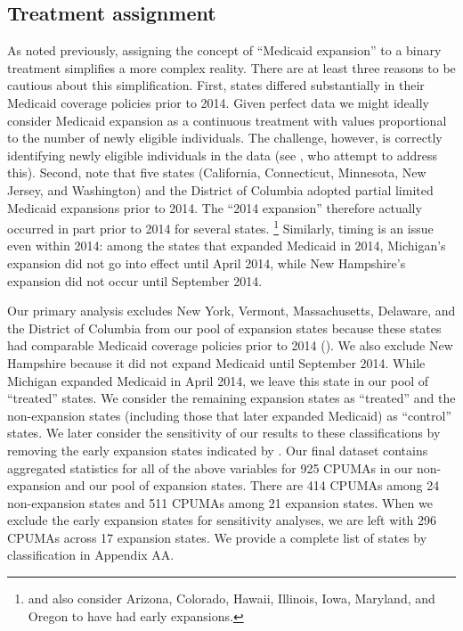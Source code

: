 \documentclass[aoas]{imsart}
\theoremstyle{plain}
\theoremstyle{remark}
\begin{document}
\subsection{Treatment assignment} \label{sssec:txassign}

As noted previously, assigning the concept of ``Medicaid expansion'' to a binary treatment simplifies a more complex reality. There are at least three reasons to be cautious about this simplification. First, states differed substantially in their Medicaid coverage policies prior to 2014. Given perfect data we might ideally consider Medicaid expansion as a continuous treatment with values proportional to the number of newly eligible individuals. The challenge, however, is correctly identifying newly eligible individuals in the data (see \cite{frean2017premium}, who attempt to address this). Second, \cite{frean2017premium} note that five states (California, Connecticut, Minnesota, New Jersey, and Washington) and the District of Columbia adopted partial limited Medicaid expansions prior to 2014. The ``2014 expansion'' therefore actually occurred in part prior to 2014 for several states. \footnote{\cite{kaestner2017effects} and \cite{courtemanche2017early} also consider Arizona, Colorado, Hawaii, Illinois, Iowa, Maryland, and Oregon to have had early expansions.} Similarly, timing is an issue even within 2014: among the states that expanded Medicaid in 2014, Michigan's expansion did not go into effect until April 2014, while New Hampshire's expansion did not occur until September 2014.

Our primary analysis excludes New York, Vermont, Massachusetts, Delaware, and the District of Columbia from our pool of expansion states because these states had comparable Medicaid coverage policies prior to 2014 (\cite{kaestner2017effects}). We also exclude New Hampshire because it did not expand Medicaid until September 2014. While Michigan expanded Medicaid in April 2014, we leave this state in our pool of ``treated'' states. We consider the remaining expansion states as ``treated'' and the non-expansion states (including those that later expanded Medicaid) as ``control'' states. We later consider the sensitivity of our results to these classifications by removing the early expansion states indicated by \cite{frean2017premium}. Our final dataset contains aggregated statistics for all of the above variables for 925 CPUMAs in our non-expansion and our pool of expansion states. There are 414 CPUMAs among 24 non-expansion states and 511 CPUMAs among 21 expansion states. When we exclude the early expansion states for sensitivity analyses, we are left with 296 CPUMAs across 17 expansion states. We provide a complete list of states by classification in Appendix AA.
\end{document}

